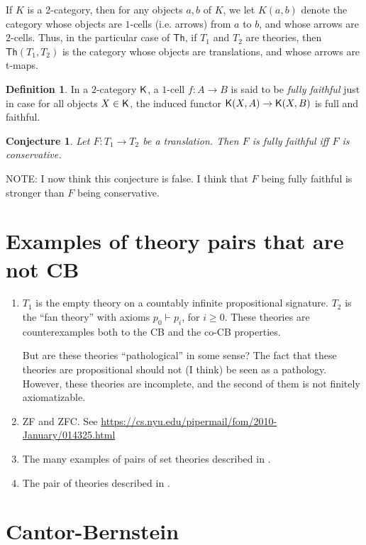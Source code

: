 \documentclass[12pt]{article}
\newtheorem{conj}[prop]{Conjecture}
\theoremstyle{definition}
\newtheorem*{defn}{Definition}
\theoremstyle{remark}
\newcommand{\3}{\mathcal}
\begin{document}
If $K$ is a 2-category, then for any objects $a,b$ of $K$, we let
$K(a,b)$ denote the category whose objects are $1$-cells (i.e. arrows)
from $a$ to $b$, and whose arrows are $2$-cells. Thus, in the
particular case of $\mathsf{Th}$, if $T_1$ and $T_2$ are theories,
then $\mathsf{Th}(T_1,T_2)$ is the category whose objects are
translations, and whose arrows are t-maps.

\begin{defn} In a $2$-category $\mathsf K$, a $1$-cell $f:A\to B$ is said to
  be \emph{fully faithful} just in case for all objects $X\in \mathsf K$,
  the induced functor $\mathsf K (X,A)\to \mathsf K (X,B)$ is full and
  faithful. \end{defn}

\begin{conj} Let $F:T_1\to T_2$ be a translation. Then $F$ is fully
  faithful iff $F$ is conservative. \end{conj}

NOTE: I now think this conjecture is false. I think that $F$ being
fully faithful is stronger than $F$ being conservative.




\section{Examples of theory pairs that are not CB}


\begin{enumerate}
\item $T_1$ is the empty theory on a countably infinite propositional
  signature. $T_2$ is the ``fan theory'' with axioms $p_0\vdash p_i$,
  for $i\geq 0$. These theories are counterexamples both to the CB and
  the co-CB properties.

  But are these theories ``pathological'' in some sense? The fact that
  these theories are propositional should not (I think) be seen as a
  pathology. However, these theories are incomplete, and the second of
  them is not finitely axiomatizable.
\item ZF and ZFC. See
  \url{https://cs.nyu.edu/pipermail/fom/2010-January/014325.html}
\item The many examples of pairs of set theories described in \citep[p
  8]{hamkins}.
\item The pair of theories described in \citep{andreka}.
\end{enumerate}

\section{Cantor-Bernstein}
\end{document}
